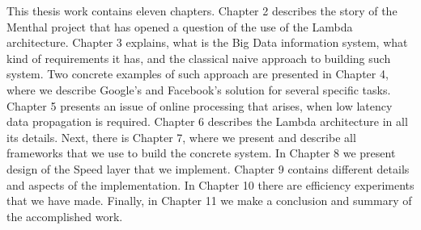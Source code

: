 This thesis work contains eleven chapters.
Chapter 2 describes the story of the Menthal project that has opened a question of the use of the Lambda architecture.
Chapter 3 explains, what is the Big Data information system, what kind of requirements it has, and the classical naive approach to building such system. 
Two concrete examples of such approach are presented in Chapter 4, where we describe Google's and Facebook's solution for several specific tasks.
Chapter 5 presents an issue of online processing that arises, when low latency data propagation is required.
Chapter 6 describes the Lambda architecture in all its details.
Next, there is Chapter 7, where we present and describe all frameworks that we use to build the concrete system.
In Chapter 8 we present design of the Speed layer that we implement.
Chapter 9 contains different details and aspects of the implementation.
In Chapter 10 there are efficiency experiments that we have made.
Finally, in Chapter 11 we make a conclusion and summary of the accomplished work.